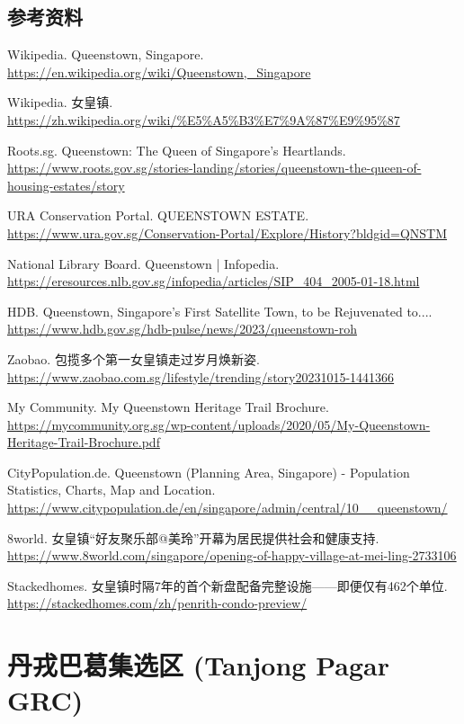 \documentclass[11pt,a4paper,twoside,openany]{book}
\begin{document}
\section*{参考资料}
\begin{enumerate}[label={[\arabic*]},leftmargin=*,topsep=2pt,itemsep=1pt,parsep=0pt]
  \item Wikipedia. Queenstown, Singapore. \url{https://en.wikipedia.org/wiki/Queenstown,_Singapore}
  \item Wikipedia. 女皇镇. \url{https://zh.wikipedia.org/wiki/%E5%A5%B3%E7%9A%87%E9%95%87}
  \item Roots.sg. Queenstown: The Queen of Singapore's Heartlands. \url{https://www.roots.gov.sg/stories-landing/stories/queenstown-the-queen-of-housing-estates/story}
  \item URA Conservation Portal. QUEENSTOWN ESTATE. \url{https://www.ura.gov.sg/Conservation-Portal/Explore/History?bldgid=QNSTM}
  \item National Library Board. Queenstown | Infopedia. \url{https://eresources.nlb.gov.sg/infopedia/articles/SIP_404_2005-01-18.html}
  \item HDB. Queenstown, Singapore's First Satellite Town, to be Rejuvenated to.... \url{https://www.hdb.gov.sg/hdb-pulse/news/2023/queenstown-roh}
  \item Zaobao. 包揽多个第一女皇镇走过岁月焕新姿. \url{https://www.zaobao.com.sg/lifestyle/trending/story20231015-1441366}
  \item My Community. My Queenstown Heritage Trail Brochure. \url{https://mycommunity.org.sg/wp-content/uploads/2020/05/My-Queenstown-Heritage-Trail-Brochure.pdf}
  \item CityPopulation.de. Queenstown (Planning Area, Singapore) - Population Statistics, Charts, Map and Location. \url{https://www.citypopulation.de/en/singapore/admin/central/10__queenstown/}
  \item 8world. 女皇镇“好友聚乐部@美玲”开幕为居民提供社会和健康支持. \url{https://www.8world.com/singapore/opening-of-happy-village-at-mei-ling-2733106}
  \item Stackedhomes. 女皇镇时隔7年的首个新盘配备完整设施——即便仅有462个单位. \url{https://stackedhomes.com/zh/penrith-condo-preview/}
\end{enumerate}

\chapter{丹戎巴葛集选区 (Tanjong Pagar GRC)}
\end{document}
